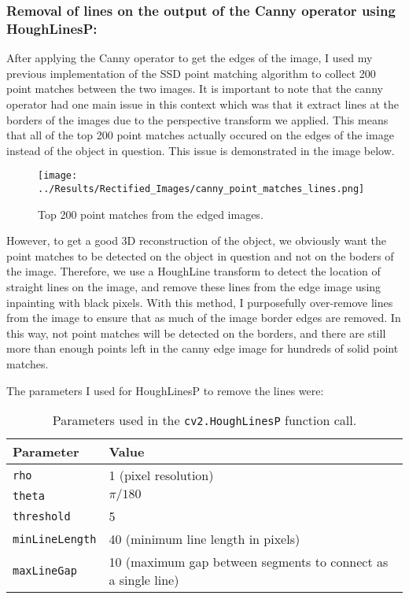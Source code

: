 \documentclass{article}
\begin{document}
\subsubsection{Removal of lines on the output of the Canny operator using HoughLinesP:}
After applying the Canny operator to get the edges of the image, I used my previous implementation of the SSD point matching algorithm to collect 200 point matches between the two images. It is important to note that the canny operator had one main issue in this context which was that it extract lines at the borders of the images due to the perspective transform we applied. This means that all of the top 200 point matches actually occured on the edges of the image instead of the object in question. This issue is demonstrated in the image below.
\begin{figure}[H]
    \centering
    \texttt{[image: ../Results/Rectified\_Images/canny\_point\_matches\_lines.png]}
    \caption{Top 200 point matches from the edged images.}
\end{figure}

However, to get a good 3D reconstruction of the object, we obviously want the point matches to be detected on the object in question and not on the boders of the image. Therefore, we use a HoughLine transform to detect the location of straight lines on the image, and remove these lines from the edge image using inpainting with black pixels. With this method, I purposefully over-remove lines from the image to ensure that as much of the image border edges are removed. In this way, not point matches will be detected on the borders, and there are still more than enough points left in the canny edge image for hundreds of solid point matches.

The parameters I used for HoughLinesP to remove the lines were:
\begin{table}[H]
    \centering
    \begin{tabular}{|l|l|}
    \hline
    \textbf{Parameter}       & \textbf{Value}          \\ \hline
    \texttt{rho}             & 1 (pixel resolution)    \\ \hline
    \texttt{theta}           & \(\pi/180\)             \\ \hline
    \texttt{threshold}       & 5                      \\ \hline
    \texttt{minLineLength}   & 40 (minimum line length in pixels) \\ \hline
    \texttt{maxLineGap}      & 10 (maximum gap between segments to connect as a single line) \\ \hline
    \end{tabular}
    \caption{Parameters used in the \texttt{cv2.HoughLinesP} function call.}
    \label{tab:hough_lines_params}
\end{table}
\end{document}
